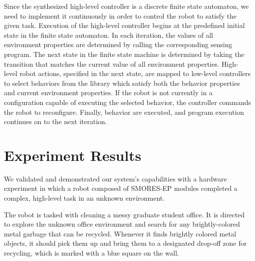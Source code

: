 \documentclass[conference]{IEEEtran}
\newcommand{\lt}{{\tt True }}
\begin{document}
Since the synthesized high-level controller is a discrete finite state automaton, we need to implement it continuously in order to control the robot to satisfy the given task. 
Execution of the high-level controller begins at the predefined initial state in the finite state automaton. In each iteration, the values of all environment properties are determined by calling the corresponding sensing program. 
The next state in the finite state machine is determined by taking the transition that matches the current value of all environment properties.
High-level robot actions, specified in the next state, are mapped to low-level controllers to select behaviors from the library which satisfy both the behavior properties and current environment properties. If the robot is not currently in a configuration capable of executing the selected behavior, the controller commands the robot to reconfigure. Finally, behavior are executed, and program execution continues on to the next iteration. 


\section{Experiment Results}
\label{sec:experiments}
%

We validated and demonstrated our system's capabilities with a hardware experiment in which a robot composed of SMORES-EP modules completed a complex, high-level task in an unknown environment.

The robot is tasked with cleaning a messy graduate student office.  It is directed to explore the unknown office environment and search for any brightly-colored metal garbage that can be recycled.  Whenever it finds brightly colored metal objects, it should pick them up and bring them to a designated drop-off zone for recycling, which is marked with a blue square on the wall.
\end{document}
